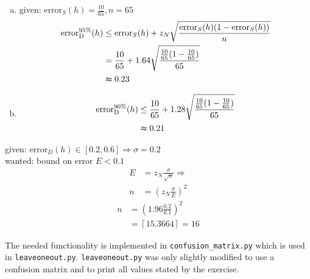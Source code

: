 \documentclass[10pt,a4paper,boxed]{hmcpset}
\begin{document}
	
		\begin{problem}
		\end{problem}

		\begin{solution}		
			\begin{enumerate}[(a)]
				\item given: $\textrm{error}_S(h) = \frac{10}{65}, n=65$
					\begin{align*}
						\textrm{error}_{\textrm{D}}^{95\%}(h) & \leq \textrm{error}_S(h) + z_N \sqrt{\frac{\textrm{error}_S(h)(1-\textrm{error}_S(h))}{n}}\\
															  & = \frac{10}{65} + 1.64 \sqrt{\frac{\frac{10}{65}(1-\frac{10}{65})}{65}}\\
															  & \thickapprox 0.23
					\end{align*}
					
				\item 
					\begin{align*}
						\textrm{error}_{\textrm{D}}^{90\%}(h) & \leq \frac{10}{65} + 1.28 					\sqrt{\frac{\frac{10}{65}(1-\frac{10}{65})}{65}}\\
															  & \thickapprox 0.21
					\end{align*}
									 			
			\end{enumerate}
			
		\end{solution}		

		\begin{problem}
		\end{problem}
		\begin{solution}
			given: $\textrm{error}_D(h) \in [0.2, 0.6] \Rightarrow \sigma = 0.2$\\
			wanted: bound on error $E<0.1$
			\begin{align*}
				E & = z_N \frac{\sigma}{\sqrt{n}} \Rightarrow \\
				n & = \left( z_N \frac{\sigma}{E} \right)^2
			\end{align*}
			\begin{align*}
				n & = \left( 1.96 \frac{0.2}{0.1} \right)^2 \\
				  & = \left\lceil 15.3664 \right\rceil = 16
			\end{align*}
		\end{solution}

		\begin{problem}
		\end{problem}
		\begin{solution}
			The needed functionality is implemented in \verb$confusion_matrix.py$
			which is used in \verb$leaveoneout.py$. 
			\verb$leaveoneout.py$ was only slightly modified to use a confusion matrix
			and to print all values stated by the exercise.
		\end{solution}
		
\end{document}
